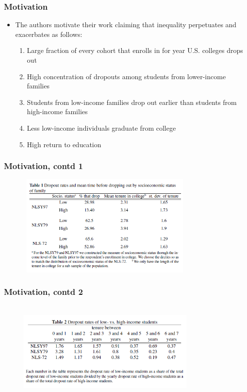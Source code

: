 \begin{frame}
	\frametitle{Motivation}
		\begin{itemize}
			\item The authors motivate their work claiming that inequality perpetuates and exacerbates as follows:
				\begin{enumerate}
					\item Large fraction of every cohort that enrolls in for year U.S. colleges drops out
			\item High concentration of dropouts among students from lower-income families
			\item Students from low-income families drop out earlier than students from high-income families
			\item Less low-income individuals graduate from college
			\item High return to education
				\end{enumerate}
		\end{itemize}
\end{frame}

\begin{frame}
	\frametitle{Motivation, contd 1}
		\begin{figure}[H] 
		\caption*{}
		\centering
		\includegraphics[width=3.5in, height=2in]{Figures/OT/table1.png}
		\end{figure}
\end{frame}

\begin{frame}
	\frametitle{Motivation, contd 2}
		\begin{figure}[H] 
		\caption*{}
		\centering
		\includegraphics[width=3.5in, height=2in]{Figures/OT/table2.png}
		\end{figure}
\end{frame}

